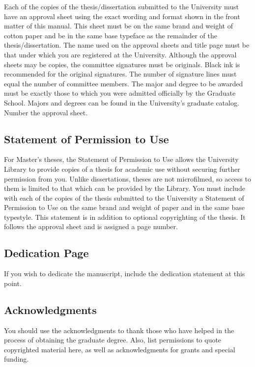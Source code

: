 Each of the copies of the thesis/dissertation submitted to the
University must have an approval sheet using the exact wording and
format shown in the front matter of this manual. This sheet must be on
the same brand and weight of cotton paper and be in the same base
typeface as the remainder of the thesis/dissertation. The name used on
the approval sheets and title page must be that under which you are
registered at the University. Although the approval sheets may be
copies, the committee signatures must be originals. Black ink is
recommended for the original signatures. The number of signature lines
must equal the number of committee members. The major and degree to be
awarded must be exactly those to which you were admitted officially by
the Graduate School. Majors and degrees can be found in the
University's graduate catalog. Number the approval sheet.

\subsection{Statement of Permission to Use}
\label{sec:StatementOfPermissionToUse}

For Master's theses, the Statement of Permission to Use allows the
University Library to provide copies of a thesis for academic use
without securing further permission from you. Unlike dissertations,
theses are not microfilmed, so access to them is limited to that which
can be provided by the Library. You must include with each of the
copies of the thesis submitted to the University a Statement of
Permission to Use on the same brand and weight of paper and in the
same base typestyle. This statement is in addition to optional
copyrighting of the thesis. It follows the approval sheet and is
assigned a page number.

\subsection{Dedication Page}
\label{sec:DedicationPage}

If you wish to dedicate the manuscript, include the dedication
statement at this point.

\subsection{Acknowledgments}
\label{sec:Acknowledgments}

You should use the acknowledgments to thank those who have helped in
the process of obtaining the graduate degree. Also, list permissions
to quote copyrighted material here, as well as acknowledgments for
grants and special funding.

